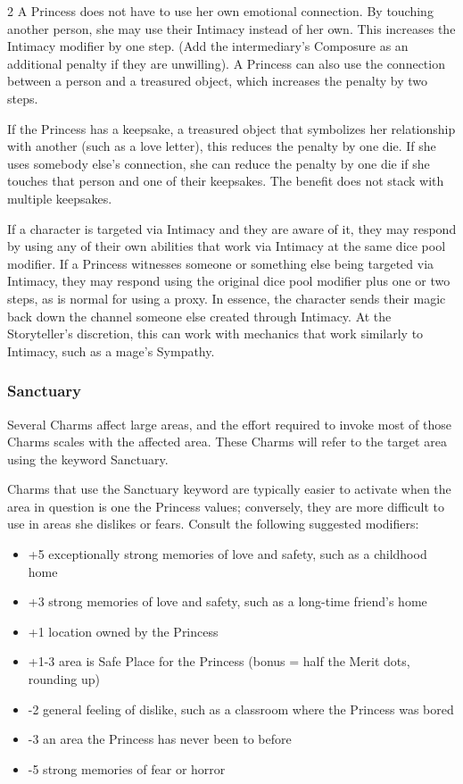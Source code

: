 \begin{multicols}{2}
A Princess does not have to use her own emotional connection. By touching another person, she may use their Intimacy instead of her own. This increases the Intimacy modifier by one step. (Add the intermediary's Composure as an additional penalty if they are unwilling). A Princess can also use the connection between a person and a treasured object, which increases the penalty by two steps. 

If the Princess has a keepsake, a treasured object that symbolizes her relationship with another (such as a love letter), this reduces the penalty by one die. If she uses somebody else's connection, she can reduce the penalty by one die if she touches that person and one of their keepsakes. The benefit does not stack with multiple keepsakes. 

If a character is targeted via Intimacy and they are aware of it, they may respond by using any of their own abilities that work via Intimacy at the same dice pool modifier. If a Princess witnesses someone or something else being targeted via Intimacy, they may respond using the original dice pool modifier plus one or two steps, as is normal for using a proxy. In essence, the character sends their magic back down the channel someone else created through Intimacy. At the Storyteller's discretion, this can work with mechanics that work similarly to Intimacy, such as a mage's Sympathy. 

\subsubsection*{Sanctuary}

Several Charms affect large areas, and the effort required to invoke most of those Charms scales with the affected area. These Charms will refer to the target area using the keyword Sanctuary. 

Charms that use the Sanctuary keyword are typically easier to activate when the area in question is one the Princess values; conversely, they are more difficult to use in areas she dislikes or fears. Consult the following suggested modifiers: 

\begin{itemize}
\item +5 exceptionally strong memories of love and safety, such as a childhood home
\item +3 strong memories of love and safety, such as a long-time friend’s home
\item +1 location owned by the Princess
\item +1-3 area is Safe Place for the Princess (bonus = half the Merit dots, rounding up)
\item -2 general feeling of dislike, such as a classroom where the Princess was bored
\item -3 an area the Princess has never been to before
\item -5 strong memories of fear or horror
\end{itemize}



\end{multicols}

